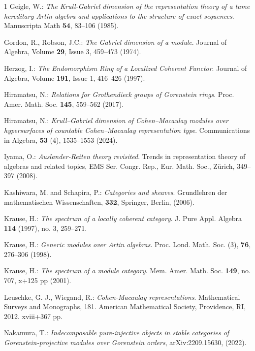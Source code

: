 \documentclass[11pt]{amsart}
\theoremstyle{definition}
\numberwithin{equation}{section}
\begin{document}
\begin{thebibliography}{1}
{\sc Geigle, W.}: 
{\it The Krull-Gabriel dimension of the representation theory of a tame hereditary Artin algebra and applications to the structure of exact sequences}.  
Manuscripta Math {\bf 54}, 83--106 (1985). 

{\sc Gordon, R.}, {\sc Robson, J.C.}: 
{\it The Gabriel dimension of a module}. 
Journal of Algebra, Volume {\bf 29}, Issue 3, 459--473 (1974). 

{\sc Herzog, I.}: 
{\it The Endomorphism Ring of a Localized Coherent Functor}. 
Journal of Algebra, Volume {\bf 191}, Issue 1, 416--426 (1997). 

{\sc Hiramatsu, N.}: 
{\it Relations for Grothendieck groups of Gorenstein rings}. 
Proc. Amer. Math. Soc. {\bf 145}, 559--562 (2017). 

{\sc Hiramatsu, N.}: 
{\it Krull--Gabriel dimension of Cohen--Macaulay modules over hypersurfaces of countable Cohen--Macaulay representation type}. 
Communications in Algebra, {\bf 53} (4), 1535--1553 (2024). 

{\sc Iyama, O.}:
{\it  Auslander-Reiten theory revisited}. 
Trends in representation theory of algebras and related topics, EMS Ser. Congr. Rep., Eur. Math. Soc., Z\"urich, 349--397 (2008). 

{\sc Kashiwara, M.} and {\sc Schapira, P.}: 
{\it Categories and sheaves}. 
Grundlehren der mathematischen Wissenschaften, {\bf 332}, Springer, Berlin, (2006). 

{\sc Krause, H.}: 
{\it The spectrum of a locally coherent category}. 
J. Pure Appl. Algebra {\bf 114} (1997), no. 3, 259--271.

{\sc Krause, H.}: 
{\it Generic modules over Artin algebras}.
Proc. Lond. Math. Soc. (3), {\bf 76}, 276--306 (1998). 

{\sc Krause, H.}: 
{\it The spectrum of a module category}. 
Mem. Amer. Math. Soc. {\bf 149}, no. 707, x+125 pp (2001). 

{\sc Leuschke, G. J.}, {\sc Wiegand, R.}:  
{\it Cohen-Macaulay representations}. 
Mathematical Surveys and Monographs, 181. 
American Mathematical Society, Providence, RI, 2012. xviii+367 pp.

{\sc Nakamura, T.}: 
{\it Indecomposable pure-injective objects in stable categories of Gorenstein-projective modules over Gorenstein orders},
arXiv:2209.15630, (2022).


\end{thebibliography}
\end{document}
